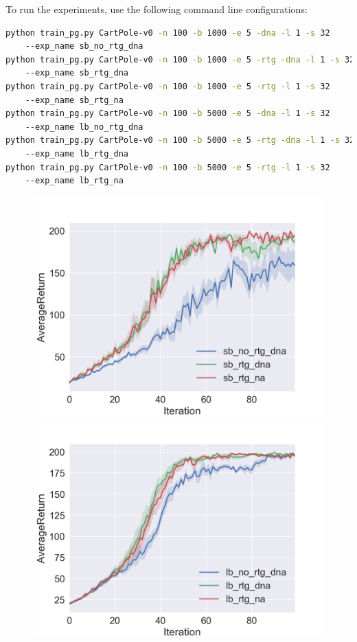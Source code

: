 \documentclass[a4paper]{article}
\theoremstyle{definition}
\begin{document}
To run the experiments, use the following command line configurations:
\begin{lstlisting}[language=bash]
python train_pg.py CartPole-v0 -n 100 -b 1000 -e 5 -dna -l 1 -s 32
    --exp_name sb_no_rtg_dna
python train_pg.py CartPole-v0 -n 100 -b 1000 -e 5 -rtg -dna -l 1 -s 32
    --exp_name sb_rtg_dna
python train_pg.py CartPole-v0 -n 100 -b 1000 -e 5 -rtg -l 1 -s 32
    --exp_name sb_rtg_na
python train_pg.py CartPole-v0 -n 100 -b 5000 -e 5 -dna -l 1 -s 32
    --exp_name lb_no_rtg_dna
python train_pg.py CartPole-v0 -n 100 -b 5000 -e 5 -rtg -dna -l 1 -s 32
    --exp_name lb_rtg_dna
python train_pg.py CartPole-v0 -n 100 -b 5000 -e 5 -rtg -l 1 -s 32
    --exp_name lb_rtg_na
\end{lstlisting}

\begin{figure}[H]
\centering
\begin{minipage}{.47\textwidth}
  \centering
  \includegraphics[width=\linewidth]{figures/4_2_1_sb.png}
\end{minipage}%
\hfill
\begin{minipage}{.47\textwidth}
  \centering
\includegraphics[width=\linewidth]{figures/4_2_1_lb.png}
\end{minipage}
\end{figure}
\end{document}
